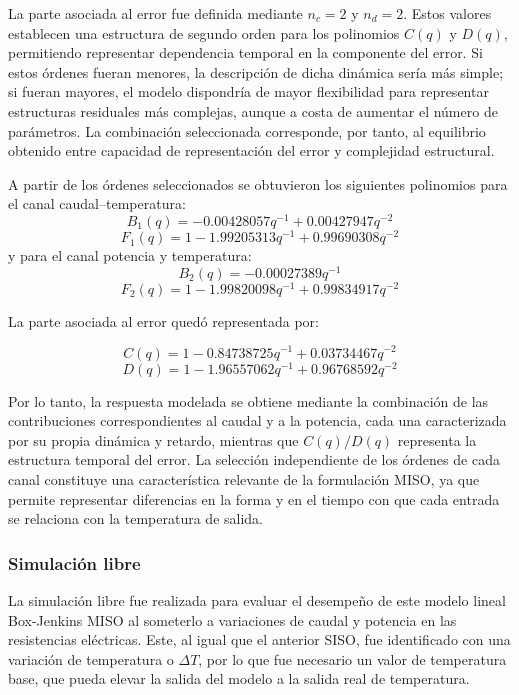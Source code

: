 \documentclass[11pt]{report}
\begin{document}
La parte asociada al error fue definida mediante $n_c=2$ y $n_d=2$. Estos valores establecen una estructura de segundo orden para los polinomios $C(q)$ y $D(q)$, permitiendo representar dependencia temporal en la componente del error. Si estos órdenes fueran menores, la descripción de dicha dinámica sería más simple; si fueran mayores, el modelo dispondría de mayor flexibilidad para representar estructuras residuales más complejas, aunque a costa de aumentar el número de parámetros. La combinación seleccionada corresponde, por tanto, al equilibrio obtenido entre capacidad de representación del error y complejidad estructural.


A partir de los órdenes seleccionados se obtuvieron los siguientes polinomios para el canal caudal–temperatura:
$$B_1(q)=−0.00428057q^{-1}+0.00427947q^{−2}$$
$$F_1(q)=1−1.99205313q^{−1}+0.99690308q^{−2}$$
y para el canal potencia y temperatura:
$$B_2(q)=−0.00027389q^{−1}$$
$$F_2(q)=1−1.99820098q^{−1}+0.99834917q^{−2}$$

 La parte asociada al error quedó representada por:

$$C(q)=1−0.84738725q^{−1}+0.03734467q^{−2}$$
$$D(q)=1−1.96557062q^{−1}+0.96768592q^{-2}$$



Por lo tanto, la respuesta modelada se obtiene mediante la combinación de las contribuciones correspondientes al caudal y a la potencia, cada una caracterizada por su propia dinámica y retardo, mientras que $C(q)/D(q)$ representa la estructura temporal del error. La selección independiente de los órdenes de cada canal constituye una característica relevante de la formulación MISO, ya que permite representar diferencias en la forma y en el tiempo con que cada entrada se relaciona con la temperatura de salida.









\subsubsection{Simulación libre}

La simulación libre fue realizada para evaluar el desempeño de este modelo lineal Box-Jenkins MISO al someterlo a variaciones de caudal y potencia en las resistencias eléctricas. Este, al igual que el anterior SISO, fue identificado con una variación de temperatura o $\Delta T$, por lo que fue necesario un valor de temperatura base, que pueda elevar la salida del modelo a la salida real de temperatura. %
\end{document}
